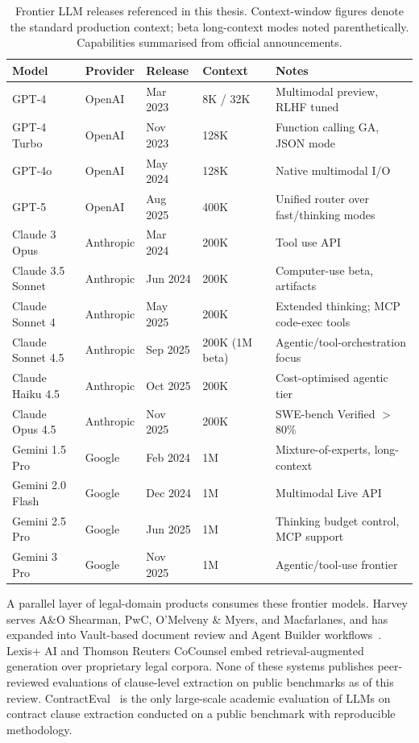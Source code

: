 \begin{table}[h]
  \centering
  \small
  \caption{Frontier LLM releases referenced in this thesis. Context-window figures
  denote the standard production context; beta long-context modes noted parenthetically.
  Capabilities summarised from official announcements.}
  \label{tab:llm-frontier}
  \begin{tabular}{p{3.2cm}p{1.7cm}p{2.0cm}p{1.6cm}p{4.2cm}}
    \toprule
    \textbf{Model} & \textbf{Provider} & \textbf{Release} &
    \textbf{Context} & \textbf{Notes} \\
    \midrule
    GPT-4           & OpenAI    & Mar 2023 & 8K / 32K  & Multimodal preview, RLHF tuned \\
    GPT-4 Turbo     & OpenAI    & Nov 2023 & 128K      & Function calling GA, JSON mode \\
    GPT-4o          & OpenAI    & May 2024 & 128K      & Native multimodal I/O \\
    GPT-5           & OpenAI    & Aug 2025 & 400K      & Unified router over fast/thinking modes \\
    Claude 3 Opus   & Anthropic & Mar 2024 & 200K      & Tool use API \\
    Claude 3.5 Sonnet & Anthropic & Jun 2024 & 200K    & Computer-use beta, artifacts \\
    Claude Sonnet 4 & Anthropic & May 2025 & 200K      & Extended thinking; MCP code-exec tools \\
    Claude Sonnet 4.5 & Anthropic & Sep 2025 & 200K (1M beta) & Agentic/tool-orchestration focus \\
    Claude Haiku 4.5 & Anthropic & Oct 2025 & 200K     & Cost-optimised agentic tier \\
    Claude Opus 4.5 & Anthropic & Nov 2025 & 200K      & SWE-bench Verified $>$80\% \\
    Gemini 1.5 Pro  & Google    & Feb 2024 & 1M        & Mixture-of-experts, long-context \\
    Gemini 2.0 Flash & Google   & Dec 2024 & 1M        & Multimodal Live API \\
    Gemini 2.5 Pro  & Google    & Jun 2025 & 1M        & Thinking budget control, MCP support \\
    Gemini 3 Pro    & Google    & Nov 2025 & 1M        & Agentic/tool-use frontier \\
    \bottomrule
  \end{tabular}
\end{table}

A parallel layer of legal-domain products consumes these frontier models. Harvey
serves A\&O Shearman, PwC, O'Melveny \& Myers, and Macfarlanes, and has expanded
into Vault-based document review and Agent Builder workflows~\cite{harvey2023ao,harvey2023pwc}.
Lexis+ AI and Thomson Reuters CoCounsel embed retrieval-augmented generation over
proprietary legal corpora. None of these systems publishes peer-reviewed evaluations
of clause-level extraction on public benchmarks as of this review. ContractEval~\cite{liu2025contracteval}
is the only large-scale academic evaluation of LLMs on contract clause extraction
conducted on a public benchmark with reproducible methodology.

